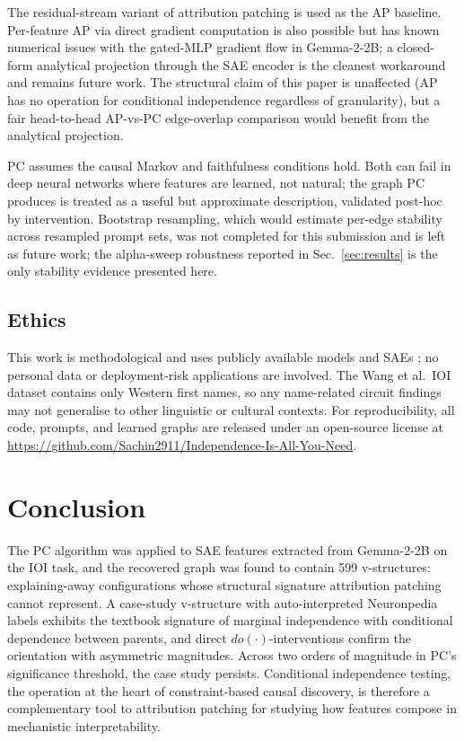 \documentclass[conference]{IEEEtran}
\begin{document}
The residual-stream variant of attribution patching is used as the AP baseline. Per-feature AP via direct gradient computation is also possible but has known numerical issues with the gated-MLP gradient flow in Gemma-2-2B; a closed-form analytical projection through the SAE encoder is the cleanest workaround and remains future work. The structural claim of this paper is unaffected (AP has no operation for conditional independence regardless of granularity), but a fair head-to-head AP-vs-PC edge-overlap comparison would benefit from the analytical projection.

PC assumes the causal Markov and faithfulness conditions hold. Both can fail in deep neural networks where features are learned, not natural; the graph PC produces is treated as a useful but approximate description, validated post-hoc by intervention. Bootstrap resampling, which would estimate per-edge stability across resampled prompt sets, was not completed for this submission and is left as future work; the alpha-sweep robustness reported in Sec.~\ref{sec:results} is the only stability evidence presented here.

\subsection{Ethics}
This work is methodological and uses publicly available models and SAEs \cite{team2024, lieberum2024}; no personal data or deployment-risk applications are involved. The Wang et al.\ IOI dataset \cite{wang2022} contains only Western first names, so any name-related circuit findings may not generalise to other linguistic or cultural contexts. For reproducibility, all code, prompts, and learned graphs are released under an open-source license at \url{https://github.com/Sachin2911/Independence-Is-All-You-Need}.

\section{Conclusion}\label{sec:conclusion}
The PC algorithm was applied to SAE features extracted from Gemma-2-2B on the IOI task, and the recovered graph was found to contain 599 v-structures: explaining-away configurations whose structural signature attribution patching cannot represent. A case-study v-structure with auto-interpreted Neuronpedia labels exhibits the textbook signature of marginal independence with conditional dependence between parents, and direct $do(\cdot)$-interventions confirm the orientation with asymmetric magnitudes. Across two orders of magnitude in PC's significance threshold, the case study persists. Conditional independence testing, the operation at the heart of constraint-based causal discovery, is therefore a complementary tool to attribution patching for studying how features compose in mechanistic interpretability.
\end{document}
